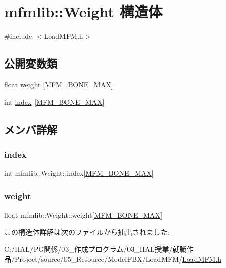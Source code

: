 \hypertarget{structmfmlib_1_1_weight}{}\section{mfmlib\+:\+:Weight 構造体}
\label{structmfmlib_1_1_weight}


{\ttfamily \#include $<$Load\+M\+F\+M.\+h$>$}

\subsection*{公開変数類}
\begin{DoxyCompactItemize}
\item 
float \mbox{\hyperlink{structmfmlib_1_1_weight_a5345575156decb810031ff9deb30f5b7}{weight}} \mbox{[}\mbox{\hyperlink{_load_m_f_m_8h_afae65bf8a30574b05ce5eb200453d4f9}{M\+F\+M\+\_\+\+B\+O\+N\+E\+\_\+\+M\+AX}}\mbox{]}
\item 
int \mbox{\hyperlink{structmfmlib_1_1_weight_a3cb8845a78f319f01f6b252f3c454e47}{index}} \mbox{[}\mbox{\hyperlink{_load_m_f_m_8h_afae65bf8a30574b05ce5eb200453d4f9}{M\+F\+M\+\_\+\+B\+O\+N\+E\+\_\+\+M\+AX}}\mbox{]}
\end{DoxyCompactItemize}


\subsection{メンバ詳解}
\mbox{\label{structmfmlib_1_1_weight_a3cb8845a78f319f01f6b252f3c454e47}} 
\subsubsection{\texorpdfstring{index}{index}}
{\footnotesize\ttfamily int mfmlib\+::\+Weight\+::index\mbox{[}\mbox{\hyperlink{_load_m_f_m_8h_afae65bf8a30574b05ce5eb200453d4f9}{M\+F\+M\+\_\+\+B\+O\+N\+E\+\_\+\+M\+AX}}\mbox{]}}

\mbox{\label{structmfmlib_1_1_weight_a5345575156decb810031ff9deb30f5b7}} 
\subsubsection{\texorpdfstring{weight}{weight}}
{\footnotesize\ttfamily float mfmlib\+::\+Weight\+::weight\mbox{[}\mbox{\hyperlink{_load_m_f_m_8h_afae65bf8a30574b05ce5eb200453d4f9}{M\+F\+M\+\_\+\+B\+O\+N\+E\+\_\+\+M\+AX}}\mbox{]}}



この構造体詳解は次のファイルから抽出されました\+:\begin{DoxyCompactItemize}
\item 
C\+:/\+H\+A\+L/\+P\+G関係/03\+\_\+作成プログラム/03\+\_\+\+H\+A\+L授業/就職作品/\+Project/source/05\+\_\+\+Resource/\+Model\+F\+B\+X/\+Load\+M\+F\+M/\mbox{\hyperlink{_load_m_f_m_8h}{Load\+M\+F\+M.\+h}}\end{DoxyCompactItemize}

